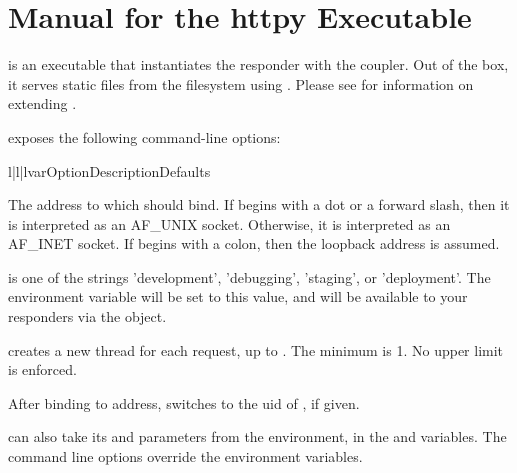 \chapter{Manual for the httpy Executable \label{manual}}

 is an executable that instantiates the 
responder with the  coupler. Out of the box, it serves static
files from the filesystem using . Please see  for information on extending .

 exposes the following command-line options:


\begin{tableiii}{l|l|l}{var}{Option}{Description}{Defaults}

    {The address to which  should bind. If  begins
    with a dot or a forward slash, then it is interpreted as an AF_UNIX socket.
    Otherwise, it is interpreted as an AF_INET socket. If  begins
    with a colon, then the loopback address is assumed.} {}

    { is one of the strings 'development', 'debugging', 'staging', or
    'deployment'.  The  environment variable will be set to
    this value, and will be available to your responders via the
     object.} {}

    { creates a new thread for each request, up to .
    The minimum is 1. No upper limit is enforced.}
    {}

    {After binding to address,  switches to the uid of
    , if given.}
    {}

\end{tableiii}


 can also take its  and  parameters from
the environment, in the  and 
variables. The command line options override the environment variables.
